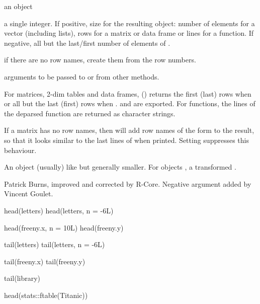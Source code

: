 %
\begin{Arguments}
\begin{ldescription}
\item[\code{x}] an object
\item[\code{n}] a single integer. If positive, size for the resulting
object: number of elements for a vector (including lists), rows for
a matrix or data frame or lines for a function. If negative, all but
the  last/first number of elements of .
\item[\code{addrownums}] if there are no row names, create them from the row
numbers.
\item[\code{...}] arguments to be passed to or from other methods.
\end{ldescription}
\end{Arguments}
%
\begin{Details}\relax
For matrices, 2-dim tables and data frames,  () returns
the first (last)  rows when  or all but the
last (first)  rows when .   and
 are exported.  For functions, the
lines of the deparsed function are returned as character strings.

If a matrix has no row names, then  will add row names of
the form  to the result, so that it looks similar to the
last lines of  when printed.  Setting  suppresses this behaviour.
\end{Details}
%
\begin{Value}
An object (usually) like  but generally smaller.  For
 objects , a transformed .
\end{Value}
%
\begin{Author}\relax
Patrick Burns, improved and corrected by R-Core. Negative argument
added by Vincent Goulet.
\end{Author}
%
\begin{Examples}
\begin{ExampleCode}
head(letters)
head(letters, n = -6L)

head(freeny.x, n = 10L)
head(freeny.y)

tail(letters)
tail(letters, n = -6L)

tail(freeny.x)
tail(freeny.y)

tail(library)

head(stats::ftable(Titanic))
\end{ExampleCode}
\end{Examples}
